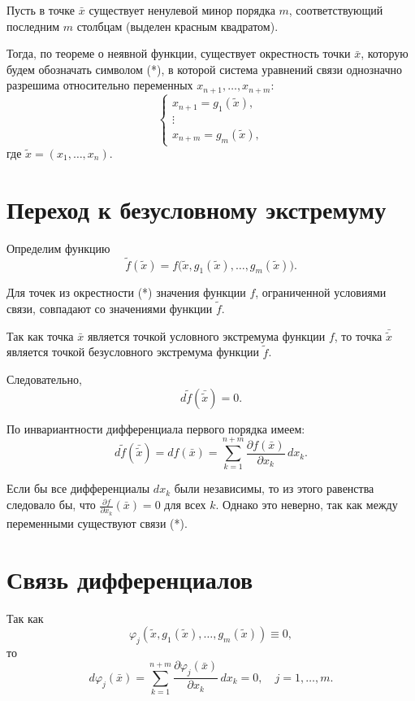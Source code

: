 \documentclass{article}
\begin{document}
Пусть в точке $\bar{x}$ существует ненулевой минор порядка $m$,
соответствующий последним $m$ столбцам (выделен красным квадратом).

Тогда, по теореме о неявной функции, существует окрестность точки $\bar{x}$,
которую будем обозначать символом (*), в которой система уравнений связи
однозначно разрешима относительно переменных $x_{n+1},\dots,x_{n+m}$:
\begin{equation}
\begin{cases}
x_{n+1} = g_1(\widetilde{x}),\\
\vdots\\
x_{n+m} = g_m(\widetilde{x}),
\end{cases}
\tag{*}
\end{equation}
где $\widetilde{x}=(x_1,\dots,x_n)$.

\section{Переход к безусловному экстремуму}

Определим функцию
\[
\widetilde{f}(\widetilde{x})
=
f\bigl(\widetilde{x},g_1(\widetilde{x}),\dots,g_m(\widetilde{x})\bigr).
\]

Для точек из окрестности (*) значения функции $f$,
ограниченной условиями связи, совпадают со значениями функции $\widetilde{f}$.

Так как точка $\bar{x}$ является точкой условного экстремума функции $f$,
то точка $\bar{\widetilde{x}}$ является точкой безусловного экстремума функции
$\widetilde{f}$.

Следовательно,
\[
d\widetilde{f}(\bar{\widetilde{x}})=0.
\]

По инвариантности дифференциала первого порядка имеем:
\begin{equation}
d\widetilde{f}(\bar{\widetilde{x}})
=
df(\bar{x})
=
\sum_{k=1}^{n+m}
\frac{\partial f(\bar{x})}{\partial x_k}\,dx_k.
\tag{**}
\end{equation}

Если бы все дифференциалы $dx_k$ были независимы,
то из этого равенства следовало бы, что
$\frac{\partial f}{\partial x_k}(\bar{x})=0$ для всех $k$.
Однако это неверно, так как между переменными существуют связи (*).

\section{Связь дифференциалов}

Так как
\[
\varphi_j(\widetilde{x},g_1(\widetilde{x}),\dots,g_m(\widetilde{x}))\equiv0,
\]
то
\[
d\varphi_j(\bar{x})
=
\sum_{k=1}^{n+m}
\frac{\partial \varphi_j(\bar{x})}{\partial x_k}\,dx_k
=
0,
\quad j=1,\dots,m.
\]
\end{document}

